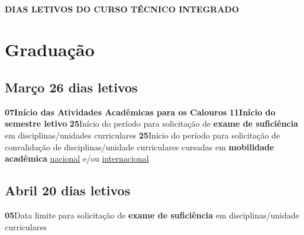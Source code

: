 \documentclass[thesis]{hmcposter}
\begin{document}
\begin{poster}
\vfill
\null
\columnbreak
~
\vfill
\begin{center}
\large \textbf{DIAS LETIVOS DO CURSO TÉCNICO INTEGRADO}
\newline
\null
\newline
\begin{table}
\centering
{}
\end{table}
\newline
\null
\newline
\end{center}
\vfill
\null
\newpage\section{\color{hmcorange}Graduação}\subsection{Março \hfill 26 dias letivos}\textbf{07}\qquad \textbf{Início das Atividades Acadêmicas para os Calouros} \newline \null\textbf{11}\qquad \textbf{Início do semestre letivo} \newline \null\textbf{25}\qquad Início do período para solicitação de \textbf{exame de suficiência} em disciplinas/unidades curriculares \newline \null\textbf{25}\qquad Início do período para solicitação de convalidação de disciplinas/unidade curriculares cursadas em \textbf{mobilidade acadêmica} \underline{nacional} e/ou \underline{internacional} \newline \null\subsection{Abril \hfill 20 dias letivos}\textbf{05}\qquad Data limite para solicitação de \textbf{exame de suficiência} em disciplinas/unidade curriculares \newline \null\vfill\null
\columnbreak

\end{poster}
\end{document}
